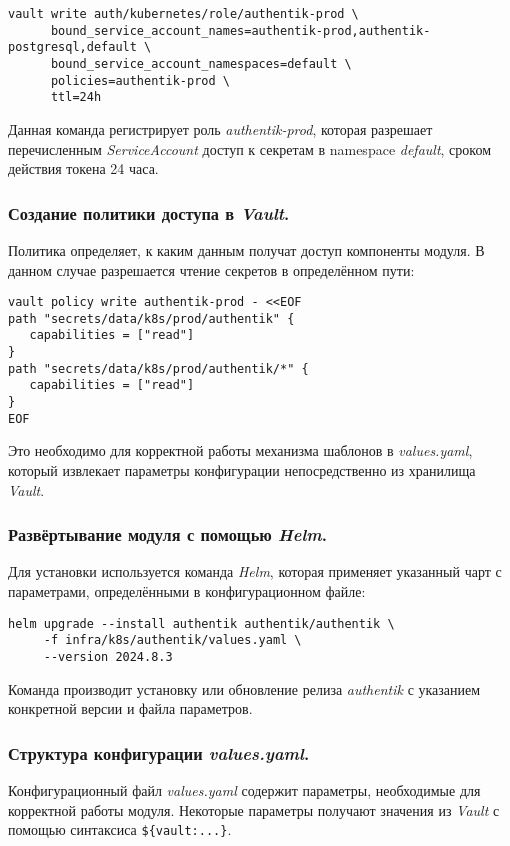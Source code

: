 \begin{lstlisting}
vault write auth/kubernetes/role/authentik-prod \
      bound_service_account_names=authentik-prod,authentik-postgresql,default \
      bound_service_account_namespaces=default \
      policies=authentik-prod \
      ttl=24h
\end{lstlisting}

Данная команда регистрирует роль \textit{authentik-prod}, которая разрешает перечисленным \textit{ServiceAccount} доступ к секретам в namespace \textit{default}, сроком действия токена 24 часа.

\subsubsection{Создание политики доступа в \textit{Vault}.} Политика определяет, к каким данным получат доступ компоненты модуля. В данном случае разрешается чтение секретов в определённом пути:

\begin{lstlisting}
vault policy write authentik-prod - <<EOF
path "secrets/data/k8s/prod/authentik" {
   capabilities = ["read"]
}
path "secrets/data/k8s/prod/authentik/*" {
   capabilities = ["read"]
}
EOF
\end{lstlisting}

Это необходимо для корректной работы механизма шаблонов в \textit{values.yaml}, который извлекает параметры конфигурации непосредственно из хранилища \textit{Vault}.

\subsubsection{Развёртывание модуля с помощью \textit{Helm}.} Для установки используется команда \textit{Helm}, которая применяет указанный чарт с параметрами, определёнными в конфигурационном файле:

\begin{lstlisting}
helm upgrade --install authentik authentik/authentik \
     -f infra/k8s/authentik/values.yaml \
     --version 2024.8.3
\end{lstlisting}

Команда производит установку или обновление релиза \textit{authentik} с указанием конкретной версии и файла параметров.

\subsubsection{Структура конфигурации \textit{values.yaml}.} Конфигурационный файл \textit{values.yaml} содержит параметры, необходимые для корректной работы модуля. Некоторые параметры получают значения из \textit{Vault} с помощью синтаксиса \lstinline|${vault:...}|.

